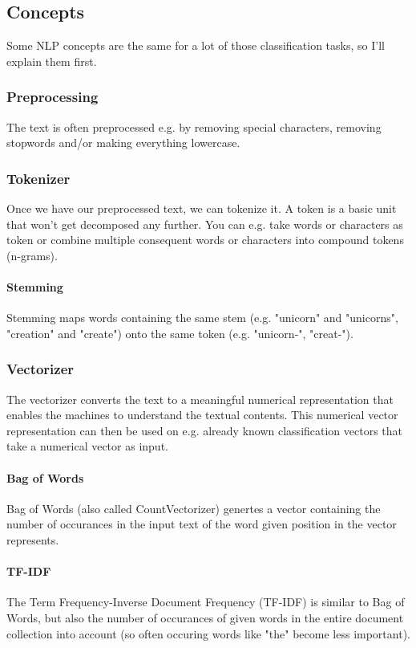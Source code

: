 \documentclass{article}
\begin{document}
\subsection{Concepts}
Some NLP concepts are the same for a lot of those classification tasks, so I'll explain them first.

\subsubsection{Preprocessing}
The text is often preprocessed e.g. by removing special characters, removing stopwords and/or making everything lowercase.

\subsubsection{Tokenizer}
Once we have our preprocessed text, we can tokenize it. A token is a basic unit that won't get decomposed any further. You can e.g. take words or characters as token or combine multiple consequent words or characters into compound tokens (n-grams). \cite{webster1992tokenization}

\paragraph{Stemming}
Stemming maps words containing the same stem (e.g. "unicorn" and "unicorns", "creation" and "create") onto the same token (e.g. "unicorn-", "creat-").  \cite{patel2021fake}

\subsubsection{Vectorizer}
The vectorizer converts the text to a meaningful numerical representation that enables the machines to understand the textual contents. \cite{singh2019vectorization} This numerical vector representation can then be used on e.g. already known classification vectors that take a numerical vector as input.


\paragraph{Bag of Words}
Bag of Words (also called CountVectorizer) genertes a vector containing the number of occurances in the input text of the word given position in the vector represents. \cite{patel2021fake}

\paragraph{TF-IDF}
The Term Frequency-Inverse Document Frequency (TF-IDF) is similar to Bag of Words, but also the number of occurances of given words in the entire document collection into account (so often occuring words like "the" become less important). \cite{patel2021fake}
\end{document}

